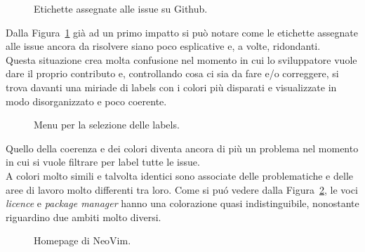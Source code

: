 \documentclass[12pt]{article} %
\begin{document}
\begin{figure}[H]
\caption{Etichette assegnate alle issue su Github.}
\label{fig:cattivoesempio1}
\end{figure}

Dalla Figura~\ref{fig:cattivoesempio1} gi\`a ad un primo impatto si pu\`o notare come le etichette assegnate alle issue ancora da risolvere siano poco esplicative e, a volte, ridondanti.\\
Questa situazione crea molta confusione nel momento in cui lo sviluppatore vuole dare il proprio contributo e, controllando cosa ci sia da fare e/o correggere, si trova davanti una miriade di labels con i colori pi\`u disparati e visualizzate in modo disorganizzato e poco coerente.

\begin{figure}[H]
\caption{Menu per la selezione delle labels.}
\label{fig:cattivoesempio2}
\end{figure}

Quello della coerenza e dei colori diventa ancora di pi\`u un problema nel momento in cui si vuole filtrare per label tutte le issue.\\
A colori molto simili e talvolta identici sono associate delle problematiche e delle aree di lavoro molto differenti tra loro. Come si pu\'o vedere dalla Figura~\ref{fig:cattivoesempio2}, le voci \emph{licence} e \emph{package manager} hanno una colorazione quasi indistinguibile, nonostante riguardino due ambiti molto diversi.

\begin{figure}[H]
\caption{Homepage di NeoVim.}
\label{fig:cattivoesempio3}
\end{figure}
\end{document}
